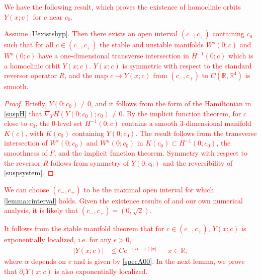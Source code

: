 \documentclass[review,onefignum,onetabnum]{siamart171218}
\newcommand{\R}{\mathbb{R}}
\newcommand{\revised}[1]{ \textcolor{red}{#1} }
\begin{document}
\revised{
We have the following result, which proves the existence of homoclinic orbits $Y(x; c)$ for $c$ near $c_0$.
\begin{lemma}\label{lemma:cinterval}
Assume \cref{Uexistshyp}. Then there exists an open interval $(c_-, c_+)$ containing $c_0$ such that for all $c \in (c_-, c_+)$ the stable and unstable manifolds $W^s(0; c)$ and $W^u(0; c)$ have a one-dimensional transverse intersection in $H^{-1}(0; c)$ which is a homoclinic orbit $Y(x; c)$. $Y(x; c)$ is symmetric with respect to the standard reversor operator $R$, and the map $c \mapsto Y(x; c)$ from $(c_-, c_+)$ to $C(\R, \R^4)$ is smooth.
\end{lemma}
\begin{proof}
Briefly, $Y(0; c_0) \neq 0$, and it follows from the form of the Hamiltonian in \cref{suspH} that $\nabla_Y H(Y(0; c_0); c_0) \neq 0$. By the implicit function theorem, for $c$ close to $c_0$, the 0-level set $H^{-1}(0; c)$ contains a smooth 3-dimensional manifold $K(c)$, with $K(c_0)$ containing $Y(0; c_0)$. The result follows from the transverse intersection of $W^s(0; c_0)$ and $W^u(0; c_0)$ in $K(c_0) \subset H^{-1}(0; c_0)$, the smoothness of $F$, and the implicit function theorem. Symmetry with respect to the reversor $R$ follows from symmetry of $Y(0; c_0)$ and the reversibility of \cref{suspsystem}.
\end{proof}
}

\revised{
\begin{remark}We can choose $(c_-, c_+)$ to be the maximal open interval for which \cref{lemma:cinterval} holds. Given the existence results of \cite{Smets2002,Berg2018} and our own numerical analysis, it is likely that $(c_-, c_+) = (0, \sqrt{2})$.
\end{remark}
}

\revised{
It follows from the stable manifold theorem that for $c \in (c_-, c_+)$, $Y(x; c)$ is exponentially localized, i.e. for any $\epsilon > 0$,
\begin{align}\label{Yexploc}
|Y(x; c)| &\leq C e^{-(\alpha - \epsilon)|x|} && x \in \R,
\end{align}
where $\alpha$ depends on $c$ and is given by \cref{specA00}. In the next lemma, we prove that $\partial_c Y(x; c)$ is also exponentially localized.
}
\end{document}
